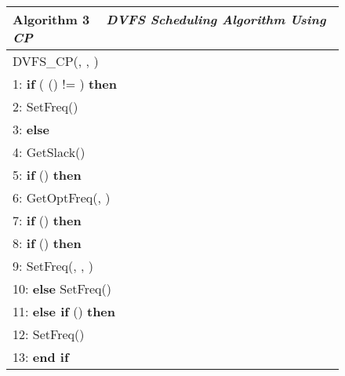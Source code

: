 \documentclass[12pt]{elsarticle}
\begin{document}
\begin{figure}
\centering
\begin{tabular}{@{}p{\columnwidth}@{}}
\toprule
\textbf{Algorithm 3} ~ \textit{DVFS Scheduling Algorithm Using CP}
\\\midrule
\textsf{DVFS\_CP}\textsf{(}, , \textsf{)}\\\hspace{2.09mm}1: \textbf{if} (  \textsf{()} != ) \textbf{then}\\
\hspace{2.09mm}2: \quad \textsf{SetFreq()}\\
\hspace{2.09mm}3: \textbf{else}\\
\hspace{2.09mm}4: \quad   \textsf{GetSlack()}\\
\hspace{2.09mm}5: \quad \textbf{if} () \textbf{then}\\
\hspace{2.09mm}6: \quad\quad   \textsf{GetOptFreq(, )}\\
\hspace{2.09mm}7: \quad \textbf{if} () \textbf{then}\\
\hspace{2.09mm}8: \quad\quad \textbf{if} () \textbf{then}\\
\hspace{2.09mm}9: \quad\quad\quad \textsf{SetFreq(, , )}\\
10: \quad\quad \textbf{else} \textsf{SetFreq()}\\11: \quad \textbf{else if} () \textbf{then}\\
12: \quad\quad \textsf{SetFreq()}\\
13: \textbf{end if}\\
\midrule
\end{tabular}
\end{figure}
\end{document}
